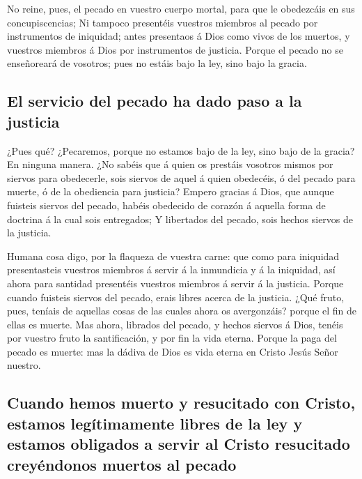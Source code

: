  No reine, pues, el pecado en vuestro cuerpo mortal, para
que le obedezcáis en sus concupiscencias;  Ni tampoco
presentéis vuestros miembros al pecado por instrumentos de iniquidad;
antes presentaos á Dios como vivos de los muertos, y vuestros miembros á
Dios por instrumentos de justicia.  Porque el pecado no se
enseñoreará de vosotros; pues no estáis bajo la ley, sino bajo la
gracia.

\hypertarget{el-servicio-del-pecado-ha-dado-paso-a-la-justicia}{%
\subsection{El servicio del pecado ha dado paso a la
justicia}\label{el-servicio-del-pecado-ha-dado-paso-a-la-justicia}}

 ¿Pues qué? ¿Pecaremos, porque no estamos bajo de la ley,
sino bajo de la gracia? En ninguna manera.  ¿No sabéis que
á quien os prestáis vosotros mismos por siervos para obedecerle, sois
siervos de aquel á quien obedecéis, ó del pecado para muerte, ó de la
obediencia para justicia?  Empero gracias á Dios, que
aunque fuisteis siervos del pecado, habéis obedecido de corazón á
aquella forma de doctrina á la cual sois entregados;  Y
libertados del pecado, sois hechos siervos de la justicia.

 Humana cosa digo, por la flaqueza de vuestra carne: que
como para iniquidad presentasteis vuestros miembros á servir á la
inmundicia y á la iniquidad, así ahora para santidad presentéis vuestros
miembros á servir á la justicia.  Porque cuando fuisteis
siervos del pecado, erais libres acerca de la justicia. 
¿Qué fruto, pues, teníais de aquellas cosas de las cuales ahora os
avergonzáis? porque el fin de ellas es muerte.  Mas ahora,
librados del pecado, y hechos siervos á Dios, tenéis por vuestro fruto
la santificación, y por fin la vida eterna.  Porque la paga
del pecado es muerte: mas la dádiva de Dios es vida eterna en Cristo
Jesús Señor nuestro.

\hypertarget{cuando-hemos-muerto-y-resucitado-con-cristo-estamos-leguxedtimamente-libres-de-la-ley-y-estamos-obligados-a-servir-al-cristo-resucitado-creyuxe9ndonos-muertos-al-pecado}{%
\subsection{Cuando hemos muerto y resucitado con Cristo, estamos
legítimamente libres de la ley y estamos obligados a servir al Cristo
resucitado creyéndonos muertos al
pecado}\label{cuando-hemos-muerto-y-resucitado-con-cristo-estamos-leguxedtimamente-libres-de-la-ley-y-estamos-obligados-a-servir-al-cristo-resucitado-creyuxe9ndonos-muertos-al-pecado}}

